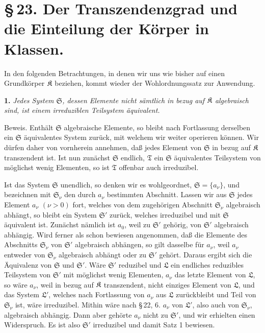 \section*{\S\,23. Der Transzendenzgrad und die Einteilung der Körper in Klassen.}

In den folgenden Betrachtungen, in denen wir uns wie bisher auf einen Grundkörper \(\mathfrak K\) beziehen, kommt wieder der Wohlordnungssatz zur Anwendung.

\textbf{1.} \emph{Jedes System \(\mathfrak S\), dessen Elemente nicht sämtlich in bezug auf \(\mathfrak K\) algebraisch sind, ist einem irreduziblen Teilsystem äquivalent.}

Beweis. Enthält \(\mathfrak S\) algebraische Elemente, so bleibt nach Fortlassung derselben ein \(\mathfrak S\) äquivalentes System zurück, mit welchem wir weiter operieren können. Wir dürfen daher von vornherein annehmen, daß jedes Element von \(\mathfrak S\) in bezug auf \(\mathfrak K\) transzendent ist. Ist nun zunächst \(\mathfrak S\) endlich, \(\mathfrak T\) ein \(\mathfrak S\) äquivalentes Teilsystem von möglichst wenig Elementen, so ist \(\mathfrak T\) offenbar auch irreduzibel.

Ist das System \(\mathfrak S\) unendlich, so denken wir es wohlgeordnet, \(\mathfrak S=\{a_\nu\}\), und bezeichnen mit \(\mathfrak S_\nu\) den durch \(a_\nu\) bestimmten Abschnitt. Lassen wir aus \(\mathfrak S\) jedes Element \(a_\nu\) \((\nu>0)\) fort, welches von dem zugehörigen Abschnitt \(\mathfrak S_\nu\) algebraisch abhängt, so bleibt ein System \(\mathfrak S'\) zurück, welches irreduzibel und mit \(\mathfrak S\) äquivalent ist. Zunächst nämlich ist \(a_0\), weil zu \(\mathfrak S'\) gehörig, von \(\mathfrak S'\) algebraisch abhängig. Wird ferner als schon bewiesen angenommen, daß die Elemente des Abschnitts \(\mathfrak S_\nu\) von \(\mathfrak S'\) algebraisch abhängen, so gilt dasselbe für \(a_\nu\), weil \(a_\nu\) entweder von \(\mathfrak S_\nu\) algebraisch abhängt oder zu \(\mathfrak S'\) gehört. Daraus ergibt sich die Äquivalenz von \(\mathfrak S\) und \(\mathfrak S'\). Wäre \(\mathfrak S'\) reduzibel und \(\mathfrak L\) ein endliches reduzibles Teilsystem von \(\mathfrak S'\) mit möglichst wenig Elementen, \(a_\nu\) das letzte Element von \(\mathfrak L\), so wäre \(a_\nu\), weil in bezug auf \(\mathfrak K\) transzendent, nicht einziges Element von \(\mathfrak L\), und das System \(\mathfrak L'\), welches nach Fortlassung von \(a_\nu\) aus \(\mathfrak L\) zurückbleibt und Teil von \(\mathfrak S_\nu\) ist, wäre irreduzibel. Mithin wäre nach \S\,22, 6. \(a_\nu\) von \(\mathfrak L'\), also auch von \(\mathfrak S_\nu\), algebraisch abhängig. Dann aber gehörte \(a_\nu\) nicht zu \(\mathfrak S'\), und wir erhielten einen Widerspruch. Es ist also \(\mathfrak S'\) irreduzibel und damit Satz 1 bewiesen.

